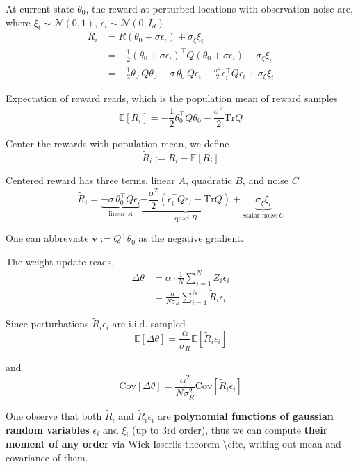     At current state $\theta_{0}$, the reward at perturbed locations
    with observation noise are, where $\xi_{i}\sim\mathcal{N}(0,1)$,
    $\epsilon_{i}\sim\mathcal{N}(0,I_{d})$
    \begin{align*}
    R_{i} & =R(\theta_{0}+\sigma\epsilon_{i})+\sigma_{\xi}\xi_{i}\\
     & =-\frac{1}{2}(\theta_{0}+\sigma\epsilon_{i})^{\top}Q(\theta_{0}+\sigma\epsilon_{i})+\sigma_{\xi}\xi_{i}\\
     & =-\frac{1}{2}\theta_{0}^{\top}Q\theta_{0}-\sigma\,\theta_{0}^{\top}Q\epsilon_{i}-\frac{\sigma^{2}}{2}\epsilon_{i}^{\top}Q\epsilon_{i}+\sigma_{\xi}\xi_{i}
    \end{align*}
    
    Expectation of reward reads, which is the population mean of reward
    samples 
    \[
    \mathbb{E}[R_{i}]=-\frac{1}{2}\theta_{0}^{\top}Q\theta_{0}-\frac{\sigma^{2}}{2}\mathrm{Tr}Q
    \]
    
    Center the rewards with population mean, we define 
    \[
    \tilde{R}_{i}:=R_{i}-\mathbb{E}[R_{i}]
    \]
    
    Centered reward has three terms, linear $A$, quadratic \textbf{$B$},
    and noise $C$ 
    \[
    \tilde{R}_{i}=\underbrace{-\sigma\,\theta_{0}^{\top}Q\epsilon_{i}}_{\text{linear }A}\underbrace{-\frac{\sigma^{2}}{2}(\epsilon_{i}^{\top}Q\epsilon_{i}-\mathrm{Tr}Q)}_{\text{quad }B}+\underbrace{\sigma_{\xi}\xi_{i}}_{\text{scalar noise }C}
    \]
    
    One can abbreviate $\mathbf{v}:=Q^{\top}\theta_{0}$ as the negative
    gradient. 
    
    The weight update reads, 
    \begin{align*}
    \Delta\theta & =\alpha\cdot\frac{1}{N}\sum_{i=1}^{N}Z_{i}\epsilon_{i}\\
     & =\frac{\alpha}{N\sigma_{R}}\sum_{i=1}^{N}\tilde{R}_{i}\epsilon_{i}
    \end{align*}
    
    Since perturbations $\tilde{R}_{i}\epsilon_{i}$ are i.i.d. sampled
    \[
    \mathbb{E}[\Delta\theta]=\frac{\alpha}{\sigma_{R}}\mathbb{E}[\tilde{R}_{i}\epsilon_{i}]
    \]
    
    and 
    \[
    \mathrm{Cov}[\Delta\theta]=\frac{\alpha^{2}}{N\sigma_{R}^{2}}\mathrm{Cov}[\tilde{R}_{i}\epsilon_{i}]
    \]
    
    One observe that both $\tilde{R}_{i}$ and $\tilde{R}_{i}\epsilon_{i}$
    are \textbf{polynomial functions of gaussian random variables} $\epsilon_{i}$
    and $\xi_{i}$ (up to 3rd order), thus we can compute \textbf{their
    moment of any order} via Wick-Isserlis theorem \textbackslash cite,
    writing out mean and covariance of them.
    
